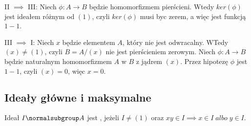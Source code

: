 II $\implies$ III: Niech $\phi:A\to B$ będzie homomorfizmem pierścieni. Wtedy $ker(\phi)$ jest ideałem różnym od $(1)$, czyli $ker(\phi)$ musi byc zerem, a więc jest funkcją $1-1$.

III $\implies$ I: Niech $x$ będzie elementem $A$, który nie jest odwracalny. WTedy $(x)\neq(1)$, czyli $B=A/(x)$ nie jest pierścieniem zerowym. Niech $\phi:A\to B$ będzie naturalnym homomorfizmem $A$ w $B$ z jądrem $(x)$. Przez hipotezę $\phi$ jest $1-1$, czyli $(x)=0$, więc $x=0$.

\proofend

\subsection{Ideały główne i maksymalne}

Ideał $I\normalsubgroup A$ jest , jeżeli $I\neq(1)$ oraz $xy\in I\implies x\in I\;albo\;y\in I$. 